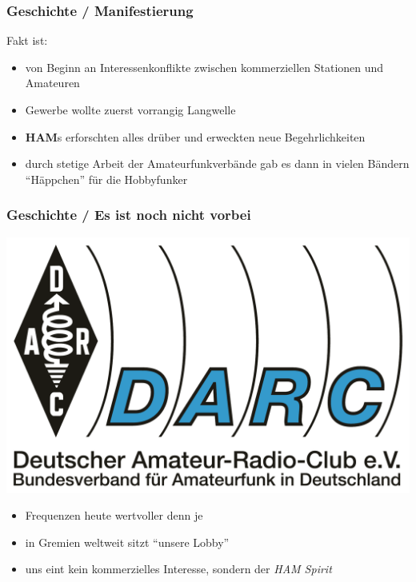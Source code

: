 \begin{frame}
    \frametitle{Geschichte / Manifestierung}

    Fakt ist:

    \begin{itemize}
        \item von Beginn an Interessenkonflikte zwischen kommerziellen Stationen
              und Amateuren
        \item Gewerbe wollte zuerst vorrangig Langwelle
        \item \textbf{HAM}s erforschten alles drüber und erweckten neue
              Begehrlichkeiten
        \item durch stetige Arbeit der Amateurfunkverbände gab es dann in
              vielen Bändern ``Häppchen'' für die Hobbyfunker
    \end{itemize}

\end{frame}

\begin{frame}
    \frametitle{Geschichte / Es ist noch nicht vorbei}
 
    \begin{center}
        \includegraphics[height=0.3\textheight]{bv01/DARC_Logo.pdf}
    \end{center}
   
    \begin{itemize}
        \item Frequenzen heute wertvoller denn je
        \item in Gremien weltweit sitzt ``unsere Lobby''
        \item uns eint kein kommerzielles Interesse, sondern der
              \emph{HAM Spirit}\hyperlink{refs}{\cite{wp}}
    \end{itemize}

\end{frame}

